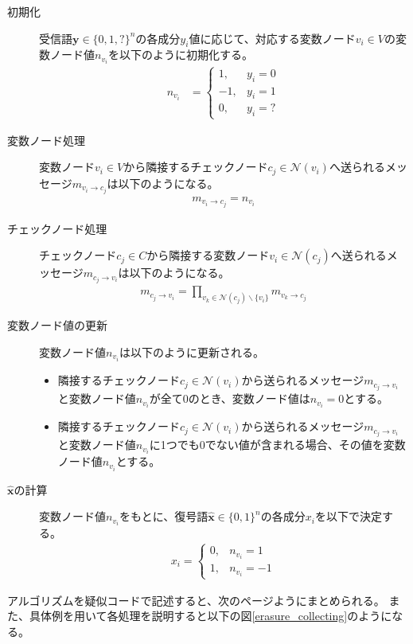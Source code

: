 \documentclass[a4j]{jsarticle}
\begin{document}
\begin{description}
\item[初期化]
受信語$\bm y \in \{ 0, 1, \mathrm{?}\}^n$の各成分$y_i$値に応じて、対応する変数ノード$v_i \in V$の変数ノード値$n_{v_i}$を以下のように初期化する。
\begin{align}
n_{v_i} &= 
\begin{cases}
1, & y_i = 0\\
-1, & y_i = 1\\
0, & y_i = \mathrm{?}
\end{cases}
\end{align}

\item[変数ノード処理]
変数ノード$v_i \in V$から隣接するチェックノード$c_j \in \mathcal{N}(v_i)$へ送られるメッセージ$m_{v_i \to c_j}$は以下のようになる。
\begin{align}
m_{v_i \to c_j} = n_{v_i}
\end{align}
\item[チェックノード処理]
チェックノード$c_j \in C$から隣接する変数ノード$v_i \in \mathcal{N}(c_j)$へ送られるメッセージ$m_{c_j \to v_i}$は以下のようになる。
\begin{align}
m_{c_j \to v_i} = \prod_{v_k \in \mathcal{N}(c_j) \backslash \{ v_i \}} m_{v_k \to c_j}
\end{align}
\item[変数ノード値の更新]
変数ノード値$n_{v_i}$は以下のように更新される。
\begin{itemize}
\item 隣接するチェックノード$c_j \in \mathcal{N}(v_i)$から送られるメッセージ$m_{c_j \to v_i}$と変数ノード値$n_{v_i}$が全て$0$のとき、変数ノード値は$n_{v_i} = 0$とする。
\item 隣接するチェックノード$c_j \in \mathcal{N}(v_i)$から送られるメッセージ$m_{c_j \to v_i}$と変数ノード値$n_{v_i}$に1つでも$0$でない値が含まれる場合、その値を変数ノード値$n_{v_i}$とする。
\end{itemize}
\item[$\hat{\bm x}$の計算]
変数ノード値$n_{v_i}$をもとに、復号語$\hat{\bm x} \in \{ 0, 1\}^n$の各成分$x_i$を以下で決定する。
\begin{align}
x_i = 
\begin{cases}
0, & n_{v_i} = 1\\
1, & n_{v_i} = -1
\end{cases}
\end{align}
\end{description}

アルゴリズムを疑似コードで記述すると、次のページようにまとめられる。
また、具体例を用いて各処理を説明すると以下の図\ref{erasure_collecting}のようになる。
\end{document}
